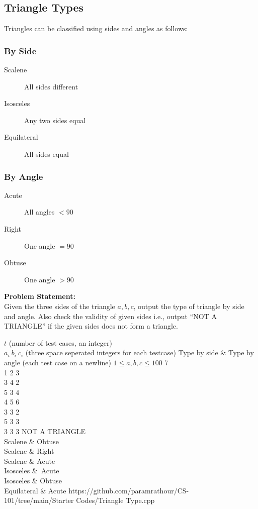 \subsection{Triangle Types}{\label{pp:triangletypes}}
Triangles can be classified using sides and angles as follows:
\subsubsection{By Side}
\begin{description}
\item[Scalene] All sides different
\item[Isosceles] Any two sides equal
\item[Equilateral] All sides equal
\end{description}
\subsubsection{By Angle}
\begin{description}
\item[Acute] All angles $< 90$\textdegree
\item[Right] One angle $= 90$\textdegree
\item[Obtuse] One angle $> 90$\textdegree
\end{description}
\textbf{Problem Statement:}\\
Given the three sides of the triangle $a,b,c$, output the type of triangle by side and angle. Also check the validity of given sides i.e., output ``NOT A TRIANGLE'' if the given sides does not form a triangle.
\begin{testcases}
	{$t$ \hfill(number of test cases, an integer)\\
	$a_{i}\ b_{i}\ c_{i}$ \hfill(three space seperated integers for each testcase)}
	{Type by side \& Type by angle \hfill{(each test case on a newline)}}
	{$1 \leq a,b,c \leq 100$}
	{7\\1 2 3\\3 4 2\\5 3 4\\4 5 6\\3 3 2\\5 3 3\\3 3 3}
	{NOT A TRIANGLE\\Scalene \& Obtuse\\Scalene \& Right\\Scalene \& Acute\\Isosceles \&\ Acute\\Isosceles \& Obtuse\\Equilateral \& Acute}
	{https://github.com/paramrathour/CS-101/tree/main/Starter Codes/Triangle Type.cpp}
\end{testcases}